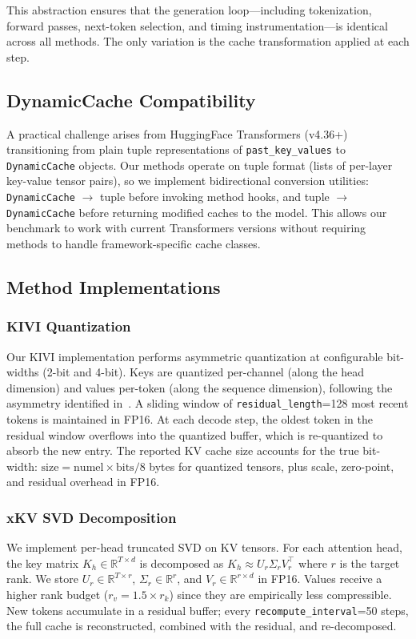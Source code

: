 \documentclass[conference]{IEEEtran}
\begin{document}
This abstraction ensures that the generation loop---including tokenization, forward passes, next-token selection, and timing instrumentation---is identical across all methods. The only variation is the cache transformation applied at each step.

\subsection{DynamicCache Compatibility}

A practical challenge arises from HuggingFace Transformers (v4.36+) transitioning from plain tuple representations of \texttt{past\_key\_values} to \texttt{DynamicCache} objects. Our methods operate on tuple format (lists of per-layer key-value tensor pairs), so we implement bidirectional conversion utilities: \texttt{DynamicCache} $\rightarrow$ tuple before invoking method hooks, and tuple $\rightarrow$ \texttt{DynamicCache} before returning modified caches to the model. This allows our benchmark to work with current Transformers versions without requiring methods to handle framework-specific cache classes.

\subsection{Method Implementations}

\subsubsection{KIVI Quantization}
Our KIVI implementation performs asymmetric quantization at configurable bit-widths (2-bit and 4-bit). Keys are quantized per-channel (along the head dimension) and values per-token (along the sequence dimension), following the asymmetry identified in~\cite{kivi}. A sliding window of \texttt{residual\_length}=128 most recent tokens is maintained in FP16. At each decode step, the oldest token in the residual window overflows into the quantized buffer, which is re-quantized to absorb the new entry. The reported KV cache size accounts for the true bit-width: $\text{size} = \text{numel} \times \text{bits} / 8$ bytes for quantized tensors, plus scale, zero-point, and residual overhead in FP16.

\subsubsection{xKV SVD Decomposition}
We implement per-head truncated SVD on KV tensors. For each attention head, the key matrix $K_h \in \mathbb{R}^{T \times d}$ is decomposed as $K_h \approx U_r \Sigma_r V_r^{\top}$ where $r$ is the target rank. We store $U_r \in \mathbb{R}^{T \times r}$, $\Sigma_r \in \mathbb{R}^r$, and $V_r \in \mathbb{R}^{r \times d}$ in FP16. Values receive a higher rank budget ($r_v = 1.5 \times r_k$) since they are empirically less compressible. New tokens accumulate in a residual buffer; every \texttt{recompute\_interval}=50 steps, the full cache is reconstructed, combined with the residual, and re-decomposed.
\end{document}
